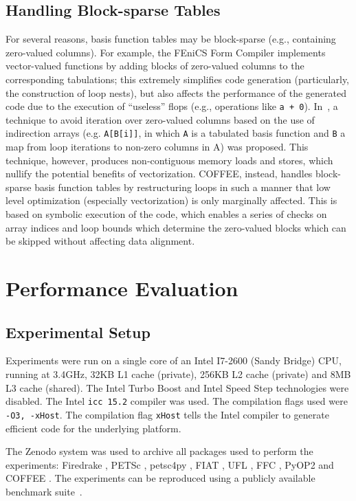 \subsection{Handling Block-sparse Tables}
\label{sec:zeros}
For several reasons, basis function tables may be block-sparse (e.g., containing zero-valued columns). For example, the FEniCS Form Compiler implements vector-valued functions by adding blocks of zero-valued columns to the corresponding tabulations; this extremely simplifies code generation (particularly, the construction of loop nests), but also affects the performance of the generated code due to the execution of ``useless'' flops (e.g., operations like \texttt{a + 0}). In~\cite{quadrature-olegaard}, a technique to avoid iteration over zero-valued columns based on the use of indirection arrays (e.g. \texttt{A[B[i]]}, in which \texttt{A} is a tabulated basis function and \texttt{B} a map from loop iterations to non-zero columns in A) was proposed. This technique, however, produces non-contiguous memory loads and stores, which nullify the potential benefits of vectorization. COFFEE, instead, handles block-sparse basis function tables by restructuring loops in such a manner that low level optimization (especially vectorization) is only marginally affected. This is based on symbolic execution of the code, which enables a series of checks on array indices and loop bounds which determine the zero-valued blocks which can be skipped without affecting data alignment.

\section{Performance Evaluation}
\label{sec:opt:perf-results}

\subsection{Experimental Setup}

Experiments were run on a single core of an Intel I7-2600 (Sandy Bridge) CPU, running at 3.4GHz, 32KB L1 cache (private), 256KB L2 cache (private) and 8MB L3 cache (shared). The Intel Turbo Boost and Intel Speed Step technologies were disabled. The Intel \texttt{icc 15.2} compiler was used. The compilation flags used were \texttt{-O3, -xHost}. The compilation flag \texttt{xHost} tells the Intel compiler to generate efficient code for the underlying platform.

The Zenodo system was used to archive all packages used to perform the experiments: Firedrake \citep{lawrence_mitchell_2016_49284}, PETSc \citep{barry_smith_2016_49285}, petsc4py \citep{firedrake_2016_49283}, FIAT \citep{marie_e_rognes_2016_49280}, UFL \citep{martin_sandve_alnaes_2016_49282}, FFC \citep{anders_logg_2016_49276}, PyOP2 \citep{florian_rathgeber_2016_49281} and COFFEE \citep{fabio_luporini_2016_49279}. The experiments can be reproduced using a publicly available benchmark suite~\citep{florian_rathgeber_2016_49290}.

